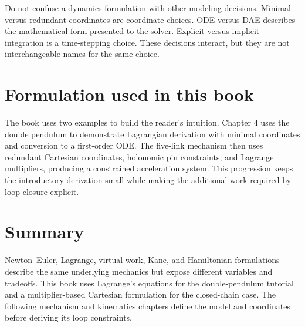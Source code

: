 \documentclass[../main.tex]{subfiles}
\begin{document}
Do not confuse a dynamics formulation with other modeling decisions. Minimal versus redundant coordinates are coordinate choices. ODE versus DAE describes the mathematical form presented to the solver. Explicit versus implicit integration is a time-stepping choice. These decisions interact, but they are not interchangeable names for the same choice.

\section{Formulation used in this book}

The book uses two examples to build the reader's intuition. Chapter 4 uses the double pendulum to demonstrate Lagrangian derivation with minimal coordinates and conversion to a first-order ODE. The five-link mechanism then uses redundant Cartesian coordinates, holonomic pin constraints, and Lagrange multipliers, producing a constrained acceleration system. This progression keeps the introductory derivation small while making the additional work required by loop closure explicit.

\section{Summary}

Newton--Euler, Lagrange, virtual-work, Kane, and Hamiltonian formulations describe the same underlying mechanics but expose different variables and tradeoffs. This book uses Lagrange's equations for the double-pendulum tutorial and a multiplier-based Cartesian formulation for the closed-chain case. The following mechanism and kinematics chapters define the model and coordinates before deriving its loop constraints.

\ifSubfilesClassLoaded{\backmatter\bookbibliography}{}
\end{document}
